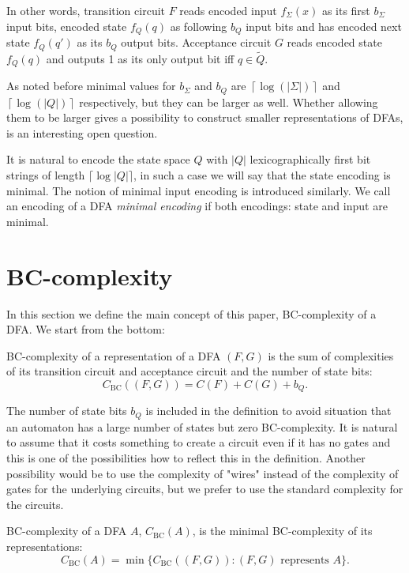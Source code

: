 \documentclass[copyright, creativecommons]{eptcs}
\newcommand{\cBC}{C_\mathrm{BC}}
\newenvironment{definition}[1][Definition]{\begin{trivlist}
\item[\hskip \labelsep {\bfseries #1}]}{\end{trivlist}}
\begin{document}
In other words, transition circuit $F$
reads encoded input $f_\Sigma(x)$ as its first $b_\Sigma$ input bits, encoded state $f_Q(q)$ as following
$b_Q$ input bits and has encoded next state $f_Q(q')$ as its $b_Q$ output bits.
Acceptance circuit $G$ reads encoded state $f_Q(q)$  and
outputs 1 as its only output bit iff $q\in\tilde{Q}$.


As noted before minimal values for $b_\Sigma$ and $b_Q$ are $\left\lceil\log(|\Sigma|)\right\rceil$
and $\left\lceil\log(|Q|)\right\rceil$ respectively,
but they can be larger as well.
Whether allowing them to be larger gives a possibility to construct smaller representations of DFAs,
is an interesting open question.

It is natural to encode the state space $Q$ with $|Q|$ lexicographically first bit strings 
of length $\lceil\log|Q|\rceil$, in such a case we will say that the state encoding is minimal.
The notion of minimal input encoding is introduced similarly.
We call an encoding of a DFA \textit{minimal encoding} if both encodings: state and input are minimal.


\section{BC-complexity}
\label{4nod}
In this section we define the main concept of this paper, BC-complexity of a DFA.
We start from the bottom:
\begin{definition}
BC-complexity of a representation of a DFA $(F,G)$ is the sum of complexities
of its transition circuit and acceptance circuit and the number of state bits:
$$\cBC((F, G)) = C(F)+C(G)+b_Q.$$
\end{definition}

The number of state bits $b_Q$ is included in the definition to avoid situation that an automaton
has a large number of states but zero BC-complexity. It is natural to assume that it costs something
to create a circuit even if it has no gates and this is one of the possibilities how to reflect
this in the definition. Another possibility would be to use the complexity of "wires"
instead of the complexity of gates for the underlying circuits, but we prefer to use the standard
complexity for the circuits.


\begin{definition}
BC-complexity of a DFA $A$,
$\cBC(A)$, is the minimal BC-complexity of its representations:
$$\cBC(A)=\min\{\cBC((F, G)): (F, G) \mbox{ represents } A\}.$$
\end{definition}
\end{document}
